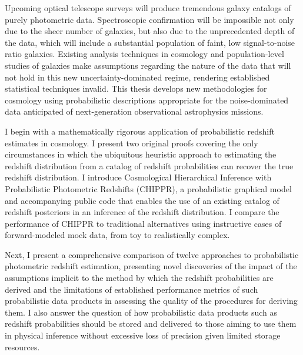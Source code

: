 Upcoming optical telescope surveys will produce tremendous galaxy catalogs of purely photometric data.
Spectroscopic confirmation will be impossible not only due to the sheer number of galaxies, but also due to the unprecedented depth of the data, which will include a substantial population of faint, low signal-to-noise ratio galaxies.
Existing analysis techniques in cosmology and population-level studies of galaxies make assumptions regarding the nature of the data that will not hold in this new uncertainty-dominated regime, rendering established statistical techniques invalid.
This thesis develops new methodologies for cosmology using probabilistic descriptions appropriate for the noise-dominated data anticipated of next-generation observational astrophysics missions. 

I begin with a mathematically rigorous application of probabilistic redshift estimates in cosmology.
I present two original proofs covering the only circumstances in which the ubiquitous heuristic approach to estimating the redshift distribution from a catalog of redshift probabilities can recover the true redshift distribution.
I introduce Cosmological Hierarchical Inference with Probabilistic Photometric Redshifts (CHIPPR), a probabilistic graphical model and accompanying public code that enables the use of an existing catalog of redshift posteriors in an inference of the redshift distribution.
I compare the performance of CHIPPR to traditional alternatives using instructive cases of forward-modeled mock data, from toy to realistically complex.

Next, I present a comprehensive comparison of twelve approaches to probabilistic photometric redshift estimation, presenting novel discoveries of the impact of the assumptions implicit to the method by which the redshift probabilities are derived and the limitations of established performance metrics of such probabilistic data products in assessing the quality of the procedures for deriving them.
I also answer the question of how probabilistic data products such as redshift probabilities should be stored and delivered to those aiming to use them in physical inference without excessive loss of precision given limited storage resources.

